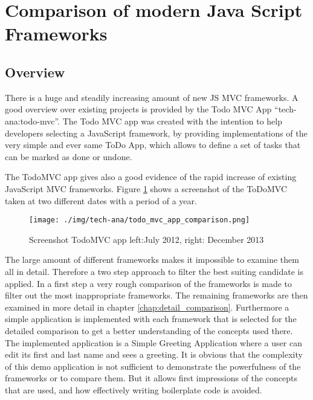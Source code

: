 \section{Comparison of modern Java Script Frameworks}


\subsection{Overview}

There is a huge and steadily increasing amount of new JS MVC frameworks.
A good overview over existing projects is provided by the Todo MVC App \enquote{tech-ana:todo-mvc}.
The Todo MVC app was created with the intention to help developers selecting a JavaScript framework, by providing implementations of the very simple and ever same ToDo App, which allows to define a set of tasks that can be marked as done or undone.


The TodoMVC app gives also a good evidence of the rapid increase of existing JavaScript MVC frameworks.
Figure \ref{fig:todoMvcComp} shows a screenshot of the ToDoMVC taken at two different dates with a period of a year.

\begin{figure}
	\centering	\texttt{[image: ./img/tech-ana/todo\_mvc\_app\_comparison.png]}
	\caption{Screenshot TodoMVC app left:July 2012, right: December 2013}
	\label{fig:todoMvcComp}
\end{figure}

The large amount of different frameworks makes it impossible to examine them all in detail.
Therefore a two step approach to filter the best suiting candidate is applied.
In a first step a very rough comparison of the frameworks is made to filter out the most inappropriate frameworks.
The remaining frameworks are then examined in more detail in chapter \ref{chap:detail_comparison}.
Furthermore a simple application is implemented with each framework that is selected for the detailed comparison to get a better understanding of the concepts used there.
The implemented application is a Simple Greeting Application where a user can edit its first and last name and sees a greeting. 
It is obvious that the complexity of this demo application is not sufficient to demonstrate the powerfulness of the frameworks or to compare them. But it allows first impressions of the concepts that are used, and how effectively writing boilerplate code is avoided.

